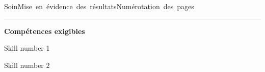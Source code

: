 \documentclass[12pt, a4paper]{article}
\begin{document}
\begin{center}
\noindent \mbox{Soin\xspace\xspace\color{DarkOrange}\faMehO\color{black}}\hfill \mbox{Mise en évidence des résultats\xspace\xspace\color{DarkOrange}\faMehO\color{black}}\hfill \mbox{Numérotation des pages\xspace\xspace\color{DarkOrange}\faMehO\color{black}}\hfill 
\end{center}


\noindent\rule{\linewidth}{.7pt}\begin{center}{\large\bf Compétences exigibles}\end{center}

\begin{minipage}[c]{0.4\linewidth}\centering
Skill number 1\xspace\xspace\color{DarkOrange}\faMehO\color{black}
\end{minipage}\hfill
\begin{minipage}[c]{0.4\linewidth}\centering
Skill number 2\xspace\xspace\color{DarkRed}\faFrownO\color{black}
\end{minipage}
\end{document}
